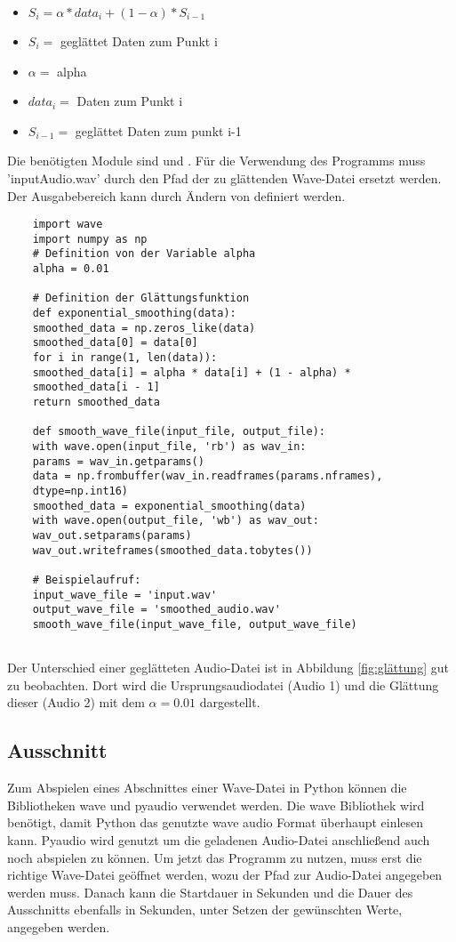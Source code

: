 \begin{itemize}
    \item[] $ S_{i} = \alpha * data_i + (1- \alpha ) * S_{i-1} $
    \item[] $ S_{i} =$ geglättet Daten zum Punkt i
    \item[]$ \alpha = $ alpha 
    \item[]$  data_i =$ Daten zum Punkt i
    \item[]$  S_{i-1} =$ geglättet Daten zum punkt i-1 
\end{itemize}
Die benötigten Module sind  und .
Für die Verwendung des Programms muss 'inputAudio.wav' durch den Pfad der zu glättenden Wave-Datei ersetzt werden. Der Ausgabebereich kann durch Ändern von  definiert werden.

\begin{verbatim}
    import wave
    import numpy as np
    # Definition von der Variable alpha
    alpha = 0.01
    
    # Definition der Glättungsfunktion
    def exponential_smoothing(data):
    smoothed_data = np.zeros_like(data)
    smoothed_data[0] = data[0]
    for i in range(1, len(data)):
    smoothed_data[i] = alpha * data[i] + (1 - alpha) * 
    smoothed_data[i - 1]
    return smoothed_data
    
    def smooth_wave_file(input_file, output_file):
    with wave.open(input_file, 'rb') as wav_in:
    params = wav_in.getparams()
    data = np.frombuffer(wav_in.readframes(params.nframes), 
    dtype=np.int16)
    smoothed_data = exponential_smoothing(data)
    with wave.open(output_file, 'wb') as wav_out:
    wav_out.setparams(params)
    wav_out.writeframes(smoothed_data.tobytes())
    
    # Beispielaufruf:
    input_wave_file = 'input.wav'
    output_wave_file = 'smoothed_audio.wav'
    smooth_wave_file(input_wave_file, output_wave_file)
    
\end{verbatim}

Der Unterschied einer geglätteten Audio-Datei ist in Abbildung \ref{fig:glättung} gut zu beobachten. Dort wird die Ursprungsaudiodatei (Audio 1) und die Glättung dieser (Audio 2) mit dem $\alpha = 0.01$  dargestellt.

\subsection{Ausschnitt}
Zum Abspielen eines Abschnittes einer Wave-Datei in Python können die Bibliotheken wave und pyaudio verwendet werden.
Die wave Bibliothek wird benötigt, damit Python das genutzte wave audio Format überhaupt einlesen kann.
Pyaudio wird genutzt um die geladenen Audio-Datei anschließend auch noch abspielen zu können.
Um jetzt das Programm zu nutzen, muss erst die richtige Wave-Datei geöffnet werden, wozu der Pfad zur Audio-Datei angegeben werden muss.
Danach kann die Startdauer in Sekunden und die Dauer des Ausschnitts ebenfalls in Sekunden, unter Setzen der gewünschten Werte, angegeben werden.

